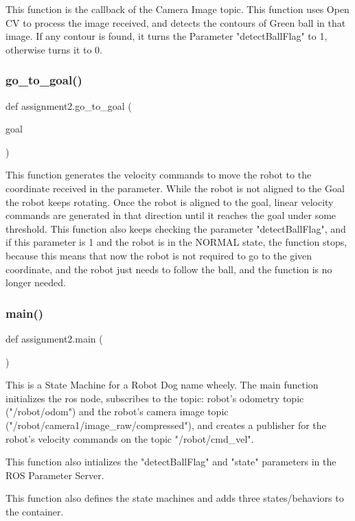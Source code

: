 \begin{DoxyVerb}This function is the callback of the Camera Image topic.
This function uses Open CV to process the image received, and detects the contours of Green ball in that image.
If any contour is found, it turns the Parameter "detectBallFlag" to 1, otherwise turns it to 0.
\end{DoxyVerb}
 \mbox{\label{namespaceassignment2_a10d502639844e6a3b88feddbc1f0ecfc}} 
\subsubsection{go\+\_\+to\+\_\+goal()}
{\footnotesize\ttfamily def assignment2.\+go\+\_\+to\+\_\+goal (\begin{DoxyParamCaption}\item[{}]{goal }\end{DoxyParamCaption})}

\begin{DoxyVerb}This function generates the velocity commands to move the robot to the coordinate received in the parameter.
While the robot is not aligned to the Goal the robot keeps rotating. Once the robot is aligned to the goal, linear velocity commands are generated in that direction until it reaches the goal under some threshold.
This function also keeps checking the parameter "detectBallFlag", and if this parameter is 1 and the robot is in the NORMAL state, the function stops, because this means that now the robot is not required to go to the given coordinate, and the robot just needs to follow the ball, and the function is no longer needed.
\end{DoxyVerb}
 \mbox{\label{namespaceassignment2_a9c06d83f39167c8a1eb1f19cfadc4930}} 
\subsubsection{main()}
{\footnotesize\ttfamily def assignment2.\+main (\begin{DoxyParamCaption}{ }\end{DoxyParamCaption})}

\begin{DoxyVerb}This is a State Machine for a Robot Dog name wheely.
The main function initializes the ros node, subscribes to the topic: robot's odometry topic ("/robot/odom")
and the robot's camera image topic ("/robot/camera1/image_raw/compressed"), and creates a publisher for the robot's velocity commands on the topic "/robot/cmd_vel".

This function also intializes the "detectBallFlag" and "state" parameters in the ROS Parameter Server.

This function also defines the state machines and adds three states/behaviors to the container.
\end{DoxyVerb}
 \mbox{\label{namespaceassignment2_a201aa32e90338713eeb36c5cce3d128f}} 
